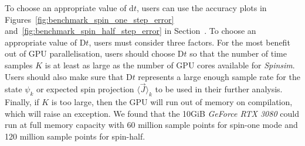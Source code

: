 \documentclass{jors}
\newcommand{\note}[1]{\textcolor{green}{\texttt{[NOTE: #1]}}}
\begin{document}
		To choose an appropriate value of $ \mathrm{d}t $, users can use the accuracy plots in Figures~\ref{fig:benchmark_spin_one_step_error} and~\ref{fig:benchmark_spin_half_step_error} in Section~. %
		To choose an appropriate value of $ \mathrm{D}t $, users must consider three factors.
		For the most benefit out of GPU parallelisation, users should choose $ \mathrm{D}t $ so that the number of time samples $ K $ is at least as large as the number of GPU cores available for \emph{Spinsim}.
		Users should also make sure that $ \mathrm{D}t $ represents a large enough sample rate for the state $ \psi_k $ or expected spin projection $ \langle \overrightarrow{J}\rangle_k $ to be used in their further analysis.
		Finally, if $ K $ is too large, then the GPU will run out of memory on compilation, which will raise an exception. %
		We found that the 10GiB \emph{GeForce RTX 3080} could run at full memory capacity with 60 million sample points for spin-one mode and 120 million sample points for spin-half.

\end{document}
